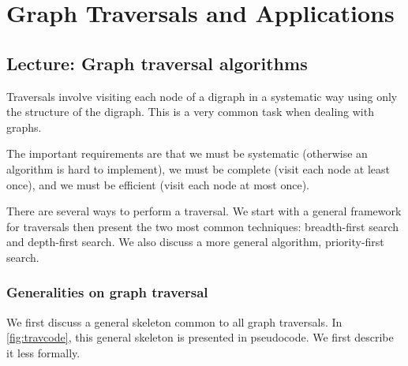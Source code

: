 \part{Graph Traversals and Applications}
\label{ch:traversal}


\chapter{Lecture: Graph traversal algorithms}

Traversals involve visiting each node of a digraph in a systematic way using only the structure of the digraph. 
This is a very common task when dealing with graphs.

The important requirements are that we must be systematic (otherwise an algorithm is hard to implement), 
we must be complete (visit each node at least once), 
and we must be efficient (visit each node at most once). 

There are several ways to perform a traversal.  
We start with a general framework for traversals then present the
two most common techniques: breadth-first search and depth-first search.
We also discuss a more general algorithm, priority-first search. 

\section{Generalities on graph traversal}
\label{sec:trav}

We first discuss a general skeleton common to all graph traversals. 
In \cref{fig:travcode}, this general skeleton is presented in pseudocode. 
We first describe it less formally.

